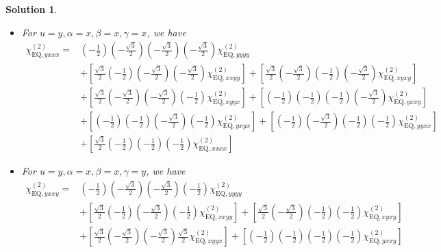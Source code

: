 \documentclass[UTF8,10pt,a4paper]{article}
\theoremstyle{Problem}
\theoremstyle{Solution}
\newtheorem*{sol}{Solution}
\begin{document}
\begin{sol}
\begin{itemize}
\begin{align}
&
\end{align}\normalsize
\item For $u=y,\alpha=x,\beta=x,\gamma=x$, we have
\footnotesize\begin{align}
\nonumber\chi_{\text{EQ},yxxx}^{(2)}=&\left(-\frac{1}{2}\right)\left(-\frac{\sqrt{3}}{2}\right)\left(-\frac{\sqrt{3}}{2}\right)\left(-\frac{\sqrt{3}}{2}\right)\chi_{\text{EQ},yyyy}^{(2)}\\
\nonumber&+\left[\frac{\sqrt{3}}{2}\left(-\frac{1}{2}\right)\left(-\frac{\sqrt{3}}{2}\right)\left(-\frac{\sqrt{3}}{2}\right)\chi_{\text{EQ},xxyy}^{(2)}\right]+\left[\frac{\sqrt{3}}{2}\left(-\frac{\sqrt{3}}{2}\right)\left(-\frac{1}{2}\right)\left(-\frac{\sqrt{3}}{2}\right)\chi_{\text{EQ},xyxy}^{(2)}\right]\\
\nonumber&+\left[\frac{\sqrt{3}}{2}\left(-\frac{\sqrt{3}}{2}\right)\left(-\frac{\sqrt{3}}{2}\right)\left(-\frac{1}{2}\right)\chi_{\text{EQ},xyyx}^{(2)}\right]+\left[\left(-\frac{1}{2}\right)\left(-\frac{1}{2}\right)\left(-\frac{1}{2}\right)\left(-\frac{\sqrt{3}}{2}\right)\chi_{\text{EQ},yxxy}^{(2)}\right]\\
\nonumber&+\left[\left(-\frac{1}{2}\right)\left(-\frac{1}{2}\right)\left(-\frac{\sqrt{3}}{2}\right)\left(-\frac{1}{2}\right)\chi_{\text{EQ},yxyx}^{(2)}\right]+\left[\left(-\frac{1}{2}\right)\left(-\frac{\sqrt{3}}{2}\right)\left(-\frac{1}{2}\right)\left(-\frac{1}{2}\right)\chi_{\text{EQ},yyxx}^{(2)}\right]\\
&+\left[\frac{\sqrt{3}}{2}\left(-\frac{1}{2}\right)\left(-\frac{1}{2}\right)\left(-\frac{1}{2}\right)\chi_{\text{EQ},xxxx}^{(2)}\right]
\end{align}\normalsize
\item For $u=y,\alpha=x,\beta=x,\gamma=y$, we have
\footnotesize\begin{align}
\nonumber\chi_{\text{EQ},yxxy}^{(2)}=&\left(-\frac{1}{2}\right)\left(-\frac{\sqrt{3}}{2}\right)\left(-\frac{\sqrt{3}}{2}\right)\left(-\frac{1}{2}\right)\chi_{\text{EQ},yyyy}^{(2)}\\
\nonumber&+\left[\frac{\sqrt{3}}{2}\left(-\frac{1}{2}\right)\left(-\frac{\sqrt{3}}{2}\right)\left(-\frac{1}{2}\right)\chi_{\text{EQ},xxyy}^{(2)}\right]+\left[\frac{\sqrt{3}}{2}\left(-\frac{\sqrt{3}}{2}\right)\left(-\frac{1}{2}\right)\left(-\frac{1}{2}\right)\chi_{\text{EQ},xyxy}^{(2)}\right]\\
\nonumber&+\left[\frac{\sqrt{3}}{2}\left(-\frac{\sqrt{3}}{2}\right)\left(-\frac{\sqrt{3}}{2}\right)\frac{\sqrt{3}}{2}\chi_{\text{EQ},xyyx}^{(2)}\right]+\left[\left(-\frac{1}{2}\right)\left(-\frac{1}{2}\right)\left(-\frac{1}{2}\right)\left(-\frac{1}{2}\right)\chi_{\text{EQ},yxxy}^{(2)}\right]\\

\end{align}
\end{itemize}
\end{sol}
\end{document}
